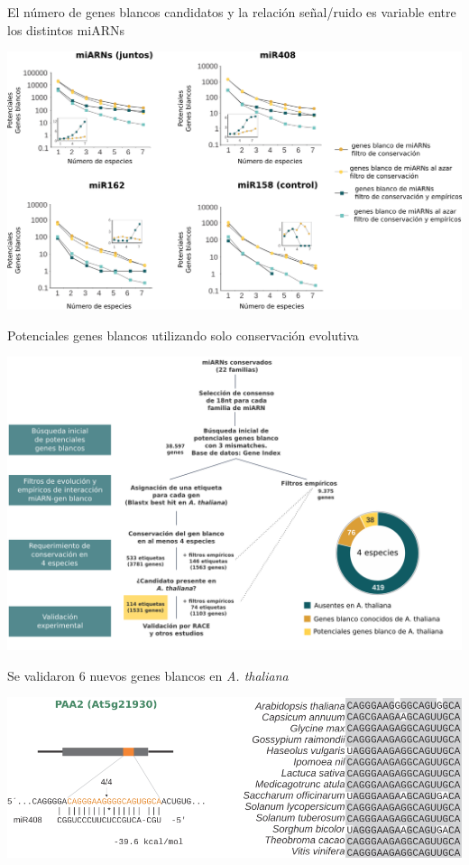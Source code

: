 \documentclass{beamer}
\begin{document}
\begin{frame}{El número de genes blancos candidatos y la relación señal/ruido es variable entre los distintos miARNs}
	\begin{center}
		\includegraphics[width=1\textwidth]{img/NAR_fig2_bis.png}
	\end{center}
\end{frame}

\begin{frame}{Potenciales genes blancos utilizando solo conservación evolutiva}
	\begin{center}
		\includegraphics[width=1\textwidth]{img/NAR_fig01y03.png}
	\end{center}
\end{frame}

\begin{frame}{Se validaron 6 nuevos genes blancos en \textit{A. thaliana}}
	\begin{center}
		\includegraphics[width=1\textwidth]{img/Figure4_retocada_nueva01.png}
	\end{center}
\end{frame}
\end{document}
